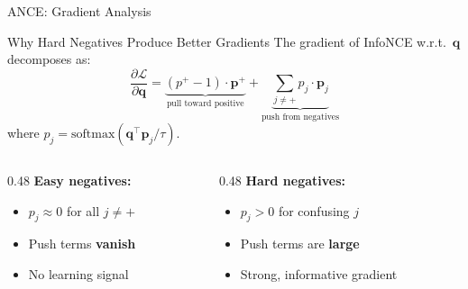 \documentclass[aspectratio=169]{beamer}
\newif\ifanimated
\newcommand{\cpause}{\ifanimated\pause\fi}
\newcommand{\vq}{\mathbf{q}}
\newcommand{\vp}{\mathbf{p}}
\begin{document}
\begin{frame}{ANCE: Gradient Analysis}
\begin{block}{Why Hard Negatives Produce Better Gradients}
The gradient of InfoNCE w.r.t.\ $\vq$ decomposes as:
$$\frac{\partial \mathcal{L}}{\partial \vq} = \underbrace{(p^+ - 1) \cdot \vp^+}_{\text{pull toward positive}} + \underbrace{\sum_{j \neq +} p_j \cdot \vp_j}_{\text{push from negatives}}$$
where $p_j = \text{softmax}(\vq^\top \vp_j / \tau)$.
\end{block}

\cpause
\vspace{0.5em}

\begin{columns}
\begin{column}{0.48\textwidth}
\textbf{Easy negatives:}
\begin{itemize}
    \item $p_j \approx 0$ for all $j \neq +$
    \item Push terms \textbf{vanish}
    \item No learning signal
\end{itemize}
\end{column}
\begin{column}{0.48\textwidth}
\textbf{Hard negatives:}
\begin{itemize}
    \item $p_j > 0$ for confusing $j$
    \item Push terms are \textbf{large}
    \item Strong, informative gradient
\end{itemize}
\end{column}
\end{columns}
\end{frame}
\end{document}
